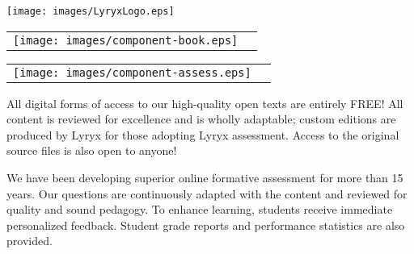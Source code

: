 \setlength{\parskip}{0pt}
\thispagestyle{empty}


\vspace{-3em}
\begin{center}
	\texttt{[image: images/LyryxLogo.eps]}

	\vspace{2em}
	\textcolor{lscstextcolour}{\textbf{\fontsize{24}{28}\selectfont {Champions of Access to Knowledge}}}
\end{center}

\vfill

\setlength{\columnsep}{4em}

\begin{multicols}{2}
\begin{center}
\begin{lscshdrbox}
\begin{tabu}{X[1,c,m] X[2,l,m]}
\vspace{0pt}
\texttt{[image: images/component-book.eps]}
&
\vspace{0pt}
\textcolor{white}{\textbf{\fontsize{14}{20}\selectfont {OPEN TEXT}}}
\end{tabu}
\end{lscshdrbox}
\end{center}

\columnbreak

\begin{center}
\begin{lscshdrbox}
\begin{tabu}{X[1,c,m] X[2,l,m]}
\vspace{0pt}
\texttt{[image: images/component-assess.eps]}
&
\vspace{0pt}
\textcolor{white}{\textbf{\fontsize{14}{20}\selectfont {ONLINE ASSESSMENT}}}
\end{tabu}
\end{lscshdrbox}
\end{center}
\end{multicols}

\begin{multicols}{2}
\parbox{1.0\linewidth}{
All digital forms of access to our high-quality open texts are entirely FREE! All content is reviewed for excellence and is wholly adaptable; custom editions are produced by Lyryx for those adopting Lyryx assessment. Access to the original source files is also open to anyone! 
}

\columnbreak

\parbox{1.0\linewidth}{
We have been developing superior online formative assessment for more than 15 years. Our questions are continuously adapted with the content and reviewed for quality and sound pedagogy. To enhance learning, students receive immediate personalized feedback. Student grade reports and performance statistics are also provided.
	}
\end{multicols}

